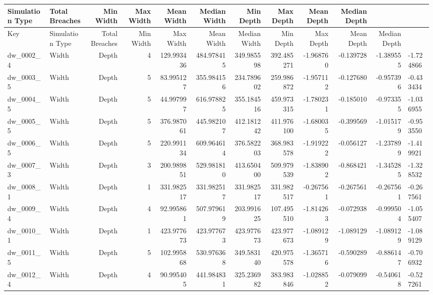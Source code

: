 \begin{tabular}{llrrrrrrrrr}
\toprule\textbf{Simulation Type} & \textbf{Total Breaches} & \textbf{Min Width} & \textbf{Max Width} & \textbf{Mean Width} & \textbf{Median Width} & \textbf{Min Depth} & \textbf{Max Depth} & \textbf{Mean Depth} & \textbf{Median Depth}\\ \midrule
      Key & Simulation Type &  Total Breaches &  Min Width &  Max Width &  Mean Width &  Median Width &  Min Depth &  Max Depth &  Mean Depth &  Median Depth \\
\midrule
dw_0002_4 &   Width & Depth &               4 & 129.993436 & 484.978415 &  349.985598 &    392.485271 &  -1.968760 &  -0.139728 &   -1.389555 &     -1.724866 \\
dw_0003_5 &   Width & Depth &               5 &  83.995127 & 355.984156 &  234.789602 &    259.986872 &  -1.957112 &  -0.127680 &   -0.957396 &     -0.433434 \\
dw_0004_5 &   Width & Depth &               5 &  44.997997 & 616.978825 &  355.184516 &    459.973315 &  -1.780231 &  -0.185010 &   -0.973355 &     -1.036955 \\
dw_0005_5 &   Width & Depth &               5 & 376.987061 & 445.982107 &  412.181242 &    411.976100 &  -1.680035 &  -0.399569 &   -1.015179 &     -0.953550 \\
dw_0006_5 &   Width & Depth &               5 & 220.991134 & 609.964614 &  376.582203 &    368.983578 &  -1.919222 &  -0.056127 &   -1.237899 &     -1.419921 \\
dw_0007_3 &   Width & Depth &               3 & 200.989851 & 529.981810 &  413.650400 &    509.979539 &  -1.838902 &  -0.868421 &   -1.345285 &     -1.328532 \\
dw_0008_1 &   Width & Depth &               1 & 331.982517 & 331.982517 &  331.982517 &    331.982517 &  -0.267561 &  -0.267561 &   -0.267561 &     -0.267561 \\
dw_0009_4 &   Width & Depth &               4 &  92.995861 & 507.979619 &  203.991625 &    107.495510 &  -1.814263 &  -0.072938 &   -0.999504 &     -1.055407 \\
dw_0010_1 &   Width & Depth &               1 & 423.977673 & 423.977673 &  423.977673 &    423.977673 &  -1.089129 &  -1.089129 &   -1.089129 &     -1.089129 \\
dw_0011_5 &   Width & Depth &               5 & 102.995868 & 530.976368 &  349.583140 &    420.975578 &  -1.365716 &  -0.590289 &   -0.886147 &     -0.706932 \\
dw_0012_4 &   Width & Depth &               4 &  90.995405 & 441.984831 &  325.236982 &    383.983846 &  -1.028852 &  -0.079099 &   -0.540618 &     -0.527261 \\

\end{tabular}
